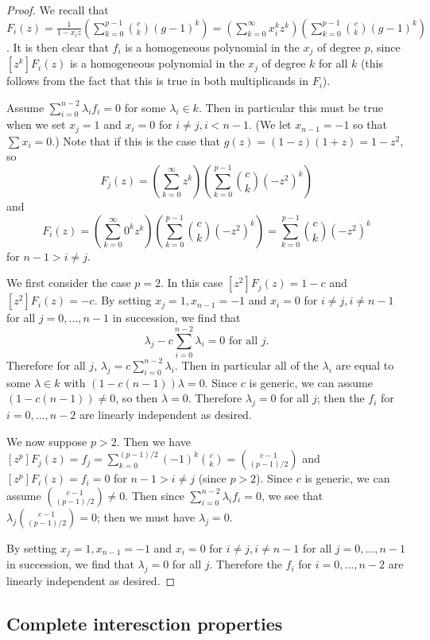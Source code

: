 \documentclass{amsart}
\numberwithin{equation}{section}
\theoremstyle{definition}
\begin{document}
\begin{proof} 
We recall that $F_i(z)=\frac{1}{1-x_iz}\left(\sum_{k=0}^{p-1} \binom{c}{k} (g-1)^k\right)=\left(\sum_{k=0}^\infty x_i^kz^k\right)\left(\sum_{k=0}^{p-1} \binom{c}{k} (g-1)^k\right)$. It is then clear that $f_i$ is a homogeneous polynomial in the $x_j$ of degree $p$, since $[z^k]F_i(z)$ is a homogeneous polynomial in the $x_j$ of degree $k$ for all $k$ (this follows from the fact that this is true in both multiplicands in $F_i$). 

Assume $\sum_{i=0}^{n-2} \lambda_if_i=0$ for some $\lambda_i \in k$. Then in particular this must be true when we set $x_j=1$ and $x_i=0$ for $i \ne j,i < n-1$. (We let $x_{n-1}=-1$ so that $\sum x_i=0$.) Note that if this is the case that $g(z)=(1-z)(1+z)=1-z^2$, so 
\[
F_j(z)=\left(\sum_{k=0}^\infty z^k\right)\left(\sum_{k=0}^{p-1} \binom{c}{k} (-z^2)^k\right)
\]
and 
\[
F_i(z)=\left(\sum_{k=0}^\infty 0^kz^k\right)\left(\sum_{k=0}^{p-1} \binom{c}{k} (-z^2)^k\right)=\sum_{k=0}^{p-1} \binom{c}{k} (-z^2)^k
\]
for $n-1>i \ne j$.

We first consider the case $p=2$. In this case $[z^2]F_j(z)=1-c$ and $[z^2]F_i(z)=-c$. By setting $x_j=1,x_{n-1}=-1$ and $x_i=0$ for $i \ne j, i \ne n-1$ for all $j=0,\dots,n-1$ in succession, we find that 
\[
\lambda_j-c\sum_{i=0}^{n-2} \lambda_i = 0 \text{ for all }j.
\]
Therefore for all $j$, $\lambda_j=c\sum_{i=0}^{n-2} \lambda_i$. Then in particular all of the $\lambda_i$ are equal to some $\lambda \in k$ with $(1-c(n-1))\lambda = 0$. Since $c$ is generic, we can assume $(1-c(n-1)) \ne 0$, so then $\lambda=0$. Therefore $\lambda_j=0$ for all $j$; then the $f_i$ for $i=0,\dots,n-2$ are linearly independent as desired.


We now suppose $p>2$. Then we have $[z^p]F_j(z)=f_j=\sum_{k=0}^{(p-1)/2} (-1)^k\binom{c}{k}=\binom{c-1}{(p-1)/2}$ and $[z^p]F_i(z)=f_i=0$ for $n-1>i \ne j$ (since $p > 2$). Since $c$ is generic, we can assume $\binom{c-1}{(p-1)/2} \ne 0$. Then since $\sum_{i=0}^{n-2} \lambda_if_i=0$, we see that $\lambda_j\binom{c-1}{(p-1)/2}=0$; then we must have $\lambda_j=0$.

By setting $x_j=1,x_{n-1}=-1$ and $x_i=0$ for $i \ne j, i \ne n-1$ for all $j=0,\dots,n-1$ in succession, we find that $\lambda_j=0$ for all $j$. Therefore the $f_i$ for $i=0,\dots,n-2$ are linearly independent as desired.
\end{proof}

\subsection{Complete interesction properties}
\end{document}
